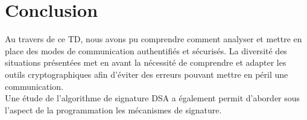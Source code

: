 \documentclass[a4paper, 11pt, oneside]{article}
\begin{document}
\section*{Conclusion}

Au travers de ce TD, nous avons pu comprendre comment analyser et mettre en place des modes de communication authentifiés et sécurisés. La diversité des situations présentées met en avant la nécessité de comprendre et adapter les outils cryptographiques afin d'éviter des erreurs pouvant mettre en péril une communication.\\
Une étude de l'algorithme de signature DSA a également permit d'aborder sous l'aspect de la programmation les mécanismes de signature.
\end{document}

